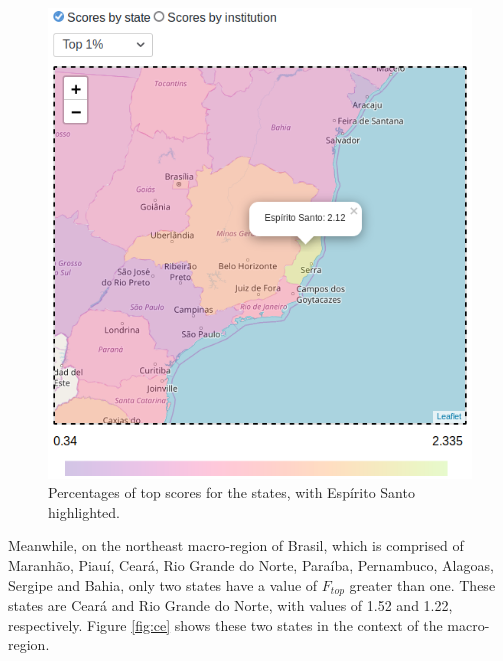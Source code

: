 \documentclass{vgtc}                          %
\begin{document}
\begin{figure}
	\centering
	\includegraphics[width=\columnwidth]{figures/es_top.png}
	\caption{Percentages of top scores for the states, with Espírito Santo highlighted.}
	\label{fig:estop}
\end{figure}

Meanwhile, on the northeast macro-region of Brasil, which is comprised of Maranhão, Piauí, Ceará, Rio Grande do Norte, Paraíba, Pernambuco, Alagoas, Sergipe and Bahia, only two states have a value of $F_{top}$ greater than one. These states are Ceará and Rio Grande do Norte, with values of 1.52 and 1.22, respectively. Figure \ref{fig:ce} shows these two states in the context of the macro-region.
\end{document}

